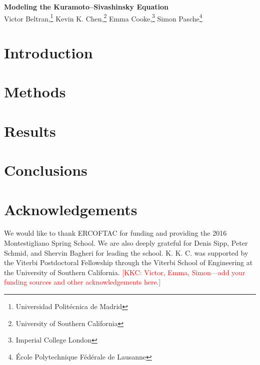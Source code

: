 \documentclass[11pt]{article}
\newcommand{\kkc}[1]{\textcolor{red}{[KKC: #1]}}
\begin{document}
\begin{center}
    {\bf \Large Modeling the Kuramoto--Sivashinsky Equation}\\
    \vspace{0.3cm}
    {%
        \large{%
            Victor Beltran,\footnote{Universidad Polit\'ecnica de Madrid}
            Kevin K. Chen,\footnote{University of Southern California}
            Emma Cooke,\footnote{Imperial College London}
            Simon Pasche\footnote{\'Ecole Polytechnique F\'ed\'erale de Lausanne}%
        }%
    }
\end{center}
\vspace{0.3cm}

\begin{abstract}
    The report should be around 6-8 pages in length. The deadline is on {\bf May, 31 2016.}
\end{abstract}

\section{Introduction}

\cite{ChaturantabutIEEECDC09}

\section{Methods}

\section{Results}

\section{Conclusions}

\section{Acknowledgements}

We would like to thank ERCOFTAC for funding and providing the 2016 Montestigliano Spring School.
We are also deeply grateful for Denis Sipp, Peter Schmid, and Shervin Bagheri for leading the school.
K. K. C. was supported by the Viterbi Postdoctoral Fellowship through the Viterbi School of Engineering at the University of Southern California.
\kkc{Victor, Emma, Simon---add your funding sources and other acknowledgements here.}


\end{document}
